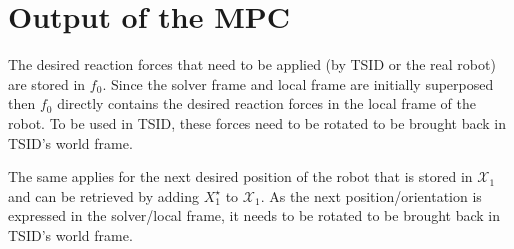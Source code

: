 \documentclass[a4paper,11pt]{article}
\begin{document}
%
%
%
%

\section{Output of the MPC}

The desired reaction forces that need to be applied (by TSID or the real robot) are stored in $f_0$. Since the solver frame and local frame are initially superposed then $f_0$ directly contains the desired reaction forces in the local frame of the robot. To be used in TSID, these forces need to be rotated to be brought back in TSID's world frame. 

The same applies for the next desired position of the robot that is stored in $\mathcal{X}_1$ and can be retrieved by adding $X_1^\star$ to $\mathcal{X}_1$. As the next position/orientation is expressed in the solver/local frame, it needs to be rotated to be brought back in TSID's world frame.
\end{document}
